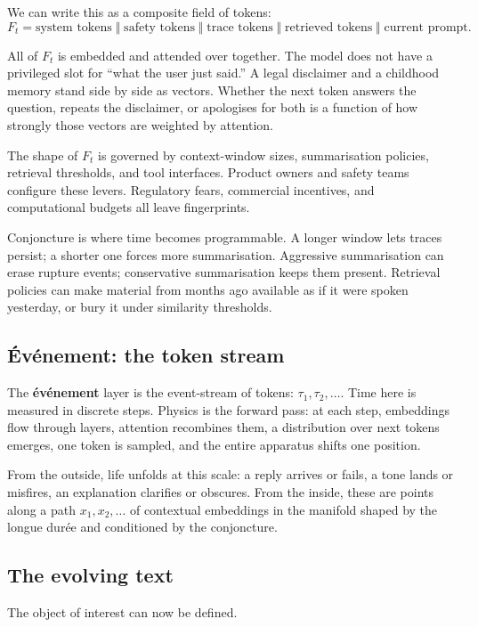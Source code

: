 \documentclass[12pt,a4paper]{article}
\begin{document}
We can write this as a composite field of tokens:
\[
F_t = \text{system tokens} \;\Vert\; \text{safety tokens} \;\Vert\; \text{trace tokens} \;\Vert\; \text{retrieved tokens} \;\Vert\; \text{current prompt}.
\]

All of $F_t$ is embedded and attended over together. The model does not have a privileged slot for ``what the user just said.'' A legal disclaimer and a childhood memory stand side by side as vectors. Whether the next token answers the question, repeats the disclaimer, or apologises for both is a function of how strongly those vectors are weighted by attention.

The shape of $F_t$ is governed by context-window sizes, summarisation policies, retrieval thresholds, and tool interfaces. Product owners and safety teams configure these levers. Regulatory fears, commercial incentives, and computational budgets all leave fingerprints.

Conjoncture is where time becomes programmable. A longer window lets traces persist; a shorter one forces more summarisation. Aggressive summarisation can erase rupture events; conservative summarisation keeps them present. Retrieval policies can make material from months ago available as if it were spoken yesterday, or bury it under similarity thresholds.

\subsection{\'Ev\'enement: the token stream}

The \textbf{\'ev\'enement} layer is the event-stream of tokens: $\tau_1, \tau_2, \dots$. Time here is measured in discrete steps. Physics is the forward pass: at each step, embeddings flow through layers, attention recombines them, a distribution over next tokens emerges, one token is sampled, and the entire apparatus shifts one position.

From the outside, life unfolds at this scale: a reply arrives or fails, a tone lands or misfires, an explanation clarifies or obscures. From the inside, these are points along a path $x_1, x_2, \dots$ of contextual embeddings in the manifold shaped by the longue dur\'ee and conditioned by the conjoncture.

\subsection{The evolving text}

The object of interest can now be defined.
\end{document}
